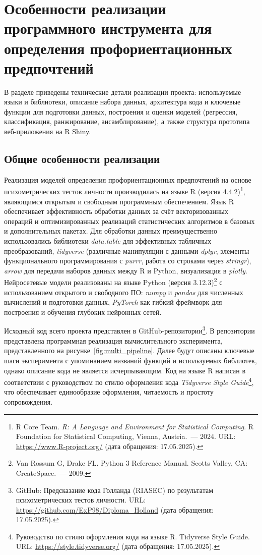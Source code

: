 
\section{Особенности реализации программного инструмента для определения профориентационных предпочтений}

В разделе приведены технические детали реализации проекта: используемые языки и библиотеки, описание набора данных, архитектура кода и ключевые функции для подготовки данных, построения и оценки моделей (регрессия, классификация, ранжирование, ансамблирование), а также структура прототипа веб-приложения на R Shiny.


\subsection{Общие особенности реализации}

Реализация моделей определения профориентационных предпочтений на основе психометрических тестов личности производилась на языке R (версия 4.4.2)\footnote{\quad R Core Team. \textit{R: A Language and Environment for Statistical Computing}. R Foundation for Statistical Computing, Vienna, Austria.~--- 2024. URL: \url{https://www.R-project.org/} (дата обращения: 17.05.2025).}, являющимся открытым и свободным программным обеспечением. Язык R обеспечивает эффективность обработки данных за счёт векторизованных операций и оптимизированных реализаций статистических алгоритмов в базовых и дополнительных пакетах. Для обработки данных преимущественно использовались библиотеки \emph{data.table} для эффективных табличных преобразований, \emph{tidyverse} (различные манипуляции с данными \emph{dplyr}, элементы функционального программирования с \emph{purrr}, работа со строками через \emph{stringr}), \emph{arrow} для передачи наборов данных между R и Python, визуализация в \emph{plotly}. Нейросетевые модели реализованы на языке Python (версия 3.12.3)\footnote{\quad Van Rossum G, Drake FL. Python 3 Reference Manual. Scotts Valley, CA: CreateSpace.~--- 2009.} с использованием открытого и свободного ПО: \emph{numpy} и \emph{pandas} для численных вычислений и подготовки данных, \emph{PyTorch} как гибкий фреймворк для построения и обучения глубоких нейронных сетей.

Исходный код всего проекта представлен в GitHub-репозитории\footnote{\quad GitHub: Предсказание кода Голланда (RIASEC) по результатам психометрических тестов личности. URL: \url{https://github.com/ExP98/Diploma_Holland} (дата обращения: 17.05.2025).}. В репозитории представлена программная реализация вычислительного эксперимента, представленного на рисунке~\ref{fig:multi_pipeline}. Далее будут описаны ключевые шаги эксперимента с упоминанием названий функций и используемых библиотек, однако описание кода не является исчерпывающим. Код на языке R написан в соответствии с руководством по стилю оформления кода \emph{Tidyverse Style Guide}\footnote{\quad Руководство по стилю оформления кода на языке R. Tidyverse Style Guide. URL: \url{https://style.tidyverse.org/} (дата обращения: 17.05.2025).}, что обеспечивает единообразие оформления, читаемость и простоту сопровождения.

